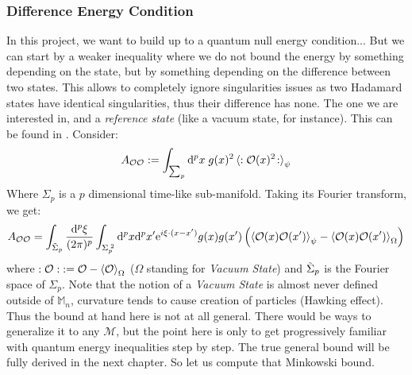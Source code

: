 \documentclass[a4paper,11pt]{article}
\numberwithin{equation}{section}
\theoremstyle{definition}
\renewcommand{\d}{{\mathrm{d}}}
\newcommand{\e}{{\mathrm{e}}}
\begin{document}
\subsubsection{Difference Energy Condition} \label{FlatCase}
In this project, we want to build up to a quantum null energy condition... But we can start by a weaker inequality where we do not bound the energy by something depending on the state, but by something depending on the difference between two states. This allows to completely ignore singularities issues as two Hadamard states have identical singularities, thus their difference has none. The one we are interested in, and a \emph{reference state} (like a vacuum state, for instance). This can be found in \cite{DSNEC}.
Consider:
\begin{equation}
    A_{\mathcal{O}\mathcal{O}}:=\int_{\sum_p}\d^px\; g(x)^2\braket{:\mathcal{O}(x)^2\!:}_\psi
\end{equation}
Where $\Sigma_p$ is a $p$ dimensional time-like sub-manifold. Taking its Fourier transform, we get:
\begin{equation}
    A_{\mathcal{O}\mathcal{O}}=\int_{\Tilde{\Sigma}_p}\frac{\d^p\xi}{(2\pi)^p}\int_{\Sigma_p^{\;2}}\d^px\d^px'\e^{i\xi\cdot(x-x')}g(x)g(x')\left(\braket{\mathcal{O}(x)\mathcal{O}(x')}_\psi-\braket{\mathcal{O}(x)\mathcal{O}(x')}_\Omega\right)
\end{equation}
where $:\mathcal{O}: \; := \mathcal{O}-\braket{\mathcal{O}}_\Omega$ ($\Omega$ standing for \emph{Vacuum State}) and $\Tilde{\Sigma}_p$ is the Fourier space of $\Sigma_p$. Note that the notion of a \emph{Vacuum State} is almost never defined outside of $\mathbb{M}_n$, curvature tends to cause creation of particles (Hawking effect). Thus the bound at hand here is not at all general. There would be ways to generalize it to any $\mathcal{M}$, but the point here is only to get progressively familiar with quantum energy inequalities step by step. The true general bound will be fully derived in the next chapter. So let us compute that Minkowski bound.
\end{document}
